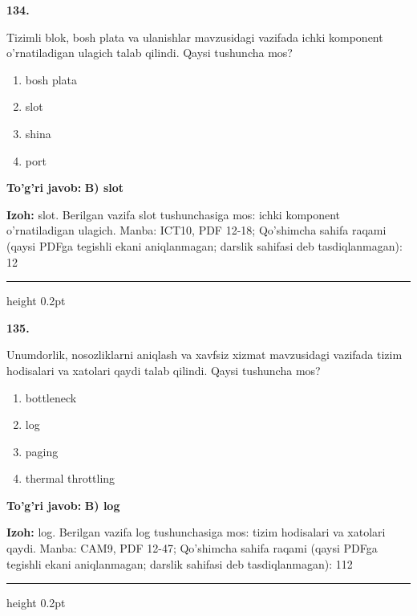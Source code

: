 \documentclass[10pt,a4paper]{article}
\begin{document}
{\bfseries\sffamily\color{ink} 134.}
\par
Tizimli blok, bosh plata va ulanishlar mavzusidagi vazifada ichki komponent o'rnatiladigan ulagich talab qilindi. Qaysi tushuncha mos?
\begin{enumerate}[label=\Alph*),leftmargin=9mm]
\item bosh plata
\item slot
\item shina
\item port
\end{enumerate}
\begin{tcolorbox}[enhanced,breakable,colback=teal!4,colframe=teal!60!black,boxrule=0.45pt,arc=1.2mm,left=2.7mm,right=2.7mm,top=1.8mm,bottom=1.8mm,before skip=2mm,after skip=2mm]
{\bfseries\sffamily\color{teal}To'g'ri javob:} \textbf{B) slot}
\par\smallskip
{\bfseries Izoh:} slot. Berilgan vazifa slot tushunchasiga mos: ichki komponent o'rnatiladigan ulagich. Manba: ICT10, PDF 12-18; Qo'shimcha sahifa raqami (qaysi PDFga tegishli ekani aniqlanmagan; darslik sahifasi deb tasdiqlanmagan): 12
\end{tcolorbox}
\vspace{2mm}\hrule height 0.2pt\vspace{3mm}

{\bfseries\sffamily\color{ink} 135.}
\par
Unumdorlik, nosozliklarni aniqlash va xavfsiz xizmat mavzusidagi vazifada tizim hodisalari va xatolari qaydi talab qilindi. Qaysi tushuncha mos?
\begin{enumerate}[label=\Alph*),leftmargin=9mm]
\item bottleneck
\item log
\item paging
\item thermal throttling
\end{enumerate}
\begin{tcolorbox}[enhanced,breakable,colback=teal!4,colframe=teal!60!black,boxrule=0.45pt,arc=1.2mm,left=2.7mm,right=2.7mm,top=1.8mm,bottom=1.8mm,before skip=2mm,after skip=2mm]
{\bfseries\sffamily\color{teal}To'g'ri javob:} \textbf{B) log}
\par\smallskip
{\bfseries Izoh:} log. Berilgan vazifa log tushunchasiga mos: tizim hodisalari va xatolari qaydi. Manba: CAM9, PDF 12-47; Qo'shimcha sahifa raqami (qaysi PDFga tegishli ekani aniqlanmagan; darslik sahifasi deb tasdiqlanmagan): 112
\end{tcolorbox}
\vspace{2mm}\hrule height 0.2pt\vspace{3mm}
\end{document}
